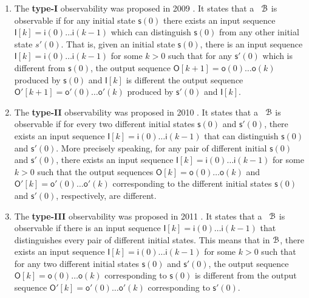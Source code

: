 \begin{enumerate}
\item The  {\bf type-I}  observability was proposed in 2009 \cite{cheng2009controllability}. It states that a \BCN\ ${\mathcal{B}}$ is observable if for any initial state   $\mathsf{s}(0)$ there exists an input sequence  $\mathsf{I}[k]=\mathsf{i}(0)\ldots\mathsf{i}(k-1)$ which can  distinguish $\mathsf{s}(0)$ from any other initial state $s'(0)$. That is,  given an initial state $\mathsf{s}(0)$, there is an input sequence $\mathsf{I}[k]=\mathsf{i}(0)\ldots\mathsf{i}(k-1)$ for some $k>0$ such that  for any  $\mathsf{s}'(0)$ which is different from $\mathsf{s}(0)$, the output sequence  $\mathsf{O}[k+1]=\mathsf{o}(0)\ldots\mathsf{o}(k)$ produced by  $\mathsf{s}(0)$ and $\mathsf{I}[k]$ is different the output sequence  $\mathsf{O}'[k+1]=\mathsf{o}'(0)\ldots \mathsf{o}'(k)$ produced by  $\mathsf{s}'(0)$ and $\mathsf{I}[k]$.

\item The  {\bf type-II} observability was proposed in 2010 \cite{Zhao2010Input}. It states that a \BCN\ ${\mathcal{B}}$ is observable if for every two different initial states $\mathsf{s}(0)$ and $\mathsf{s}'(0)$, there exists an input sequence $\mathsf{I}[k]=\mathsf{i}(0)\ldots\mathsf{i}(k-1)$ that can distinguish $\mathsf{s}(0)$ and $\mathsf{s}'(0)$. More precisely speaking,  for any pair of different initial  $\mathsf{s}(0)$ and $\mathsf{s}'(0)$, there exists an input sequence  $\mathsf{I}[k]=\mathsf{i}(0)\ldots\mathsf{i}(k-1)$ for some $k>0$ such that the output sequences $\mathsf{O}[k]=\mathsf{o}(0)\ldots\mathsf{o}(k)$ and  $\mathsf{O}'[k]=\mathsf{o}'(0)\ldots\mathsf{o}'(k)$ corresponding to  the different initial states  $\mathsf{s}(0)$ and $\mathsf{s}'(0)$, respectively, are different.
	
\item The  {\bf type-III} observability was proposed in 2011 \cite{Cheng2011Identification}.  It states that a \BCN\ ${\mathcal{B}}$ is observable if there is an input sequence $\mathsf{I}[k]=\mathsf{i}(0)\ldots\mathsf{i}(k-1)$ that distinguishes every pair of different initial states. This means that in ${\mathcal{B}}$, there exists an input sequence  $\mathsf{I}[k]=\mathsf{i}(0)\ldots\mathsf{i}(k-1)$ for some $k>0$ such that for any two different initial states $\mathsf{s}(0)$ and $\mathsf{s}'(0)$, the output sequence $\mathsf{O}[k]=\mathsf{o}(0)\ldots\mathsf{o}(k)$  corresponding to  $\mathsf{s}(0)$  is different from the output sequence  $\mathsf{O}'[k]=\mathsf{o}'(0)\ldots\mathsf{o}'(k)$ corresponding to $\mathsf{s}'(0)$.
	

\end{enumerate}
